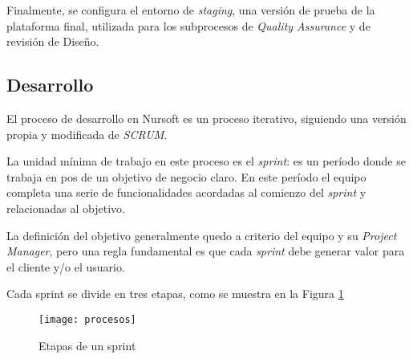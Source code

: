 Finalmente, se configura el entorno de \textit{staging}, una versión de prueba de la plataforma final, utilizada para los subprocesos de \textit{Quality Assurance} 
y de revisión de Diseño.

\subsection{Desarrollo}

El proceso de desarrollo en Nursoft es un proceso iterativo, siguiendo una versión propia y modificada de \textit{SCRUM}.

La unidad mínima de trabajo en este proceso es el \textit{sprint}: es un período donde se trabaja en pos
de un objetivo de negocio claro. En este período el equipo completa una serie de funcionalidades acordadas al comienzo
del \textit{sprint} y relacionadas al objetivo.

La definición del objetivo generalmente quedo a criterio del equipo y su \textit{Project Manager}, pero una regla
fundamental es que cada \textit{sprint} debe generar valor para el cliente y/o el usuario.

Cada sprint se divide en tres etapas, como se muestra en la Figura \ref{fig:sprint}

\begin{figure}[h]
  \centering
  \texttt{[image: procesos]}
  \caption{Etapas de un sprint}
  \label{fig:sprint}
\end{figure}

